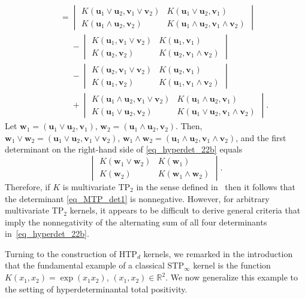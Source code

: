 \documentclass[pdftex]{sigma}
\numberwithin{equation}{section}
\def\R{{\mathbb R}}
\def\uu{\boldsymbol{u}}
\def\vv{\boldsymbol{v}}
\def\ww{\boldsymbol{w}}
\begin{document}
\begin{Example}
\begin{gather}
\qquad=
\begin{vmatrix}
K(\uu_1 \vee \uu_2,\vv_1 \vee \vv_2) & K(\uu_1 \vee \uu_2,\vv_1) \\
K(\uu_1 \wedge \uu_2,\vv_2) & K(\uu_1 \wedge \uu_2,\vv_1 \wedge \vv_2)
\end{vmatrix} \nonumber \\
\phantom{\qquad= }{} - \begin{vmatrix}
K(\uu_1,\vv_1 \vee \vv_2) & K(\uu_1,\vv_1) \\
K(\uu_2,\vv_2) & K(\uu_2,\vv_1 \wedge \vv_2)
\end{vmatrix} \nonumber \\
\phantom{\qquad= }{} - \begin{vmatrix}
K(\uu_2,\vv_1 \vee \vv_2) & K(\uu_2,\vv_1) \\
K(\uu_1,\vv_2) & K(\uu_1,\vv_1 \wedge \vv_2)
\end{vmatrix} \nonumber \\
\phantom{\qquad= }{} + \begin{vmatrix}
K(\uu_1 \wedge \uu_2,\vv_1 \vee \vv_2) & K(\uu_1 \wedge \uu_2,\vv_1) \\
K(\uu_1 \vee \uu_2,\vv_2) & K(\uu_1 \vee \uu_2,\vv_1 \wedge \vv_2)
\end{vmatrix} .\label{eq_hyperdet_22b}
\end{gather}
Let $\ww_1 = (\uu_1 \vee \uu_2,\vv_1)$, $\ww_2 = (\uu_1 \wedge \uu_2,\vv_2)$. Then, $\ww_1 \vee \ww_2 = (\uu_1 \vee \uu_2,\vv_1 \vee \vv_2)$, $\ww_1 \wedge \ww_2 = (\uu_1 \wedge \uu_2,\vv_1 \wedge \vv_2)$, and the first determinant on the right-hand side of \eqref{eq_hyperdet_22b} equals
\begin{equation}
\label{eq_MTP_det1}
\begin{vmatrix}
K(\ww_1 \vee \ww_2) & K(\ww_1) \\
K(\ww_2) & K(\ww_1 \wedge \ww_2)
\end{vmatrix}.
\end{equation}
Therefore, if $K$ is multivariate TP$_2$ in the sense defined in~\cite{karlinrinott80} then it follows that the determinant \eqref{eq_MTP_det1} is nonnegative. However, for arbitrary multivariate TP$_2$ kernels, it appears to be difficult to derive general criteria that imply the nonnegativity of the alternating sum of all four determinants in~\eqref{eq_hyperdet_22b}.
\end{Example}

Turning to the construction of HTP$_d$ kernels, we remarked in the introduction that the fundamental example of a classical STP$_\infty$ kernel is the function $K(x_1,x_2) = \exp(x_1 x_2)$, $(x_1,x_2) \in \R^2$. We now generalize this example to the setting of hyperdeterminantal total positivity.
\end{document}
